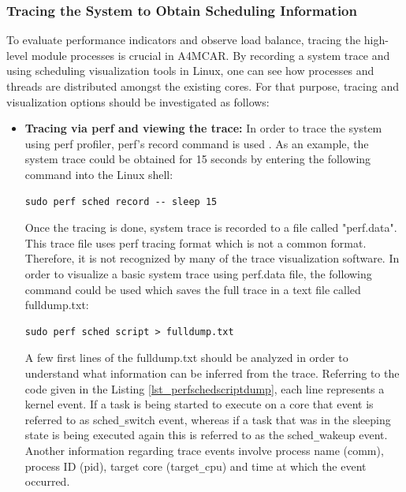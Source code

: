 \subsubsection{Tracing the System to Obtain Scheduling Information}
To evaluate performance indicators and observe load balance, tracing the high-level module processes is crucial in A4MCAR. By recording a system trace and using scheduling visualization tools in Linux, one can see how processes and threads are distributed amongst the existing cores. For that purpose, tracing and visualization options should be investigated as follows:
\begin{itemize}
	\item \textbf{Tracing via perf and viewing the trace:}
	In order to trace the system using perf profiler, perf's record command is used \cite{perf2}. As an example, the system trace could be obtained for 15 seconds by entering the following command into the Linux shell:
	\begin{lstlisting}[style=bash]
		sudo perf sched record -- sleep 15
	\end{lstlisting}
	Once the tracing is done, system trace is recorded to a file called "perf.data". This trace file uses perf tracing format which is not a common format. Therefore, it is not recognized by many of the trace visualization software. In order to visualize a basic system trace using perf.data file, the following command could be used which saves the full trace in a text file called fulldump.txt:
	\begin{lstlisting}[style=bash]
		sudo perf sched script > fulldump.txt
	\end{lstlisting}
	A few first lines of the fulldump.txt should be analyzed in order to understand what information can be inferred from the trace. Referring to the code given in the Listing \ref{lst_perfschedscriptdump}, each line represents a kernel event. If a task is being started to execute on a core that event is referred to as sched\texttt{\_}switch event, whereas if a task that was in the sleeping state is being executed again this is referred to as the sched\texttt{\_}wakeup event. Another information regarding trace events involve process name (comm), process ID (pid), target core (target\texttt{\_}cpu) and time at which the event occurred. 
	
	

\end{itemize}

